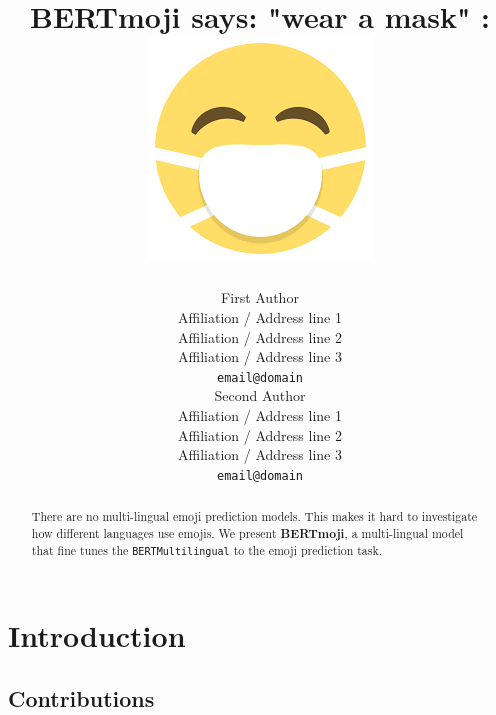 \documentclass[11pt]{article}
\title{\textbf{BERTmoji} says: "wear a mask" :  \includegraphics[scale=0.07]{images/mask_photo.png}}
\author{First Author \\
  Affiliation / Address line 1 \\
  Affiliation / Address line 2 \\
  Affiliation / Address line 3 \\
  {\tt email@domain} \\\And
  Second Author \\
  Affiliation / Address line 1 \\
  Affiliation / Address line 2 \\
  Affiliation / Address line 3 \\
  {\tt email@domain} \\}
\date{}
\begin{document}
\maketitle
\begin{abstract}
    There are no multi-lingual emoji prediction models. This makes it hard to investigate
    how different languages use emojis. We present \textbf{BERTmoji}, a multi-lingual model 
    that fine tunes the \texttt{BERTMultilingual} to the emoji prediction task.
\end{abstract}

%
% 





\section{Introduction}
\label{sec:intro}

\subsection{Contributions}
\end{document}
